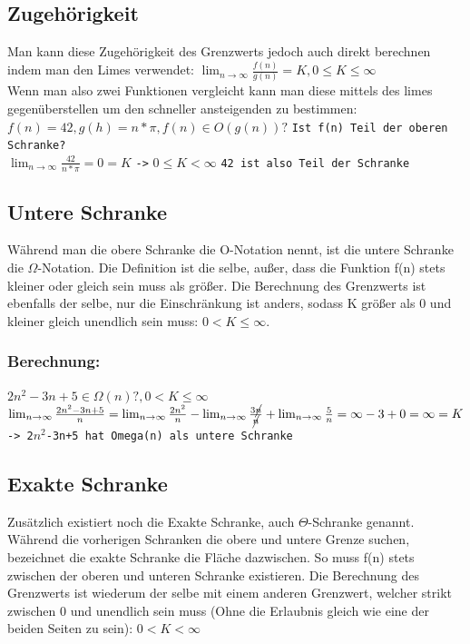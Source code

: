\documentclass{article}
\begin{document}
	\subsection{Zugehörigkeit}
	Man kann diese Zugehörigkeit des Grenzwerts jedoch auch direkt berechnen indem man den Limes verwendet: $\lim_{n\to\infty}\frac{f(n)}{g(n)}=K, 0\leq K\leq \infty$ \\
	Wenn man also zwei Funktionen vergleicht kann man diese mittels des limes gegenüberstellen um den schneller ansteigenden zu bestimmen: \\
	$f(n)=42, g(h)=n*\pi, f(n)\in O(g(n))?$ \texttt{Ist f(n) Teil der oberen Schranke?} \\
	$\lim_{n\to\infty}\frac{42}{n*\pi}=0=K$ \texttt{->} $0\leq K < \infty$ \texttt{42 ist also Teil der Schranke} \\
	\subsection{Untere Schranke}
	Während man die obere Schranke die O-Notation nennt, ist die untere Schranke die $\Omega$-Notation. Die Definition ist die selbe, außer, dass die Funktion f(n) stets kleiner oder gleich sein muss als größer. Die Berechnung des Grenzwerts ist ebenfalls der selbe, nur die Einschränkung ist anders, sodass K größer als 0 und kleiner gleich unendlich sein muss: $0 < K \leq \infty$.
	\subsubsection{Berechnung:}
	$2n^2-3n+5\in \Omega(n)?, 0<K\leq\infty$ \\
	$\lim_{n\to\infty}\frac{2n^2-3n+5}{n}=\lim_{n\to\infty}\frac{2n^2}{n}-\lim_{n\to\infty}\frac{3\cancel{n}}{\cancel{n}}+\lim_{n\to\infty}\frac{5}{n}=\infty-3+0=\infty=K$ \texttt{-> 2$n^2$-3n+5 hat Omega(n) als untere Schranke}
	\subsection{Exakte Schranke}
	Zusätzlich existiert noch die Exakte Schranke, auch $\Theta$-Schranke genannt. Während die vorherigen Schranken die obere und untere Grenze suchen, bezeichnet die exakte Schranke die Fläche dazwischen. So muss f(n) stets zwischen der oberen und unteren Schranke existieren. Die Berechnung des Grenzwerts ist wiederum der selbe mit einem anderen Grenzwert, welcher strikt zwischen 0 und unendlich sein muss (Ohne die Erlaubnis gleich wie eine der beiden Seiten zu sein): $0 < K <\infty$
\end{document}
